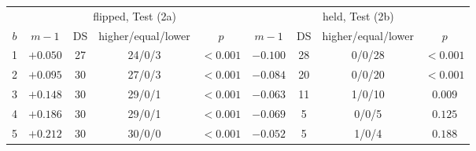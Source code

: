 \centering\footnotesize\setlength{\tabcolsep}{5pt}\begin{tabular}{@{}ccccccccc@{}}\toprule
 & \multicolumn{4}{c}{flipped, Test (2a)} & \multicolumn{4}{c}{held, Test (2b)} \\ \cmidrule(lr){2-5}\cmidrule(l){6-9}
$b$ & $m - 1$ & DS & higher/equal/lower & $p$ & $m - 1$ & DS & higher/equal/lower & $p$ \\ \midrule
1 & $+0.050$ & 27 & 24/0/3 & $<0.001$ & $-0.100$ & 28 & 0/0/28 & $<0.001$ \\
2 & $+0.095$ & 30 & 27/0/3 & $<0.001$ & $-0.084$ & 20 & 0/0/20 & $<0.001$ \\
3 & $+0.148$ & 30 & 29/0/1 & $<0.001$ & $-0.063$ & 11 & 1/0/10 & $0.009$ \\
4 & $+0.186$ & 30 & 29/0/1 & $<0.001$ & $-0.069$ & 5 & 0/0/5 & $0.125$ \\
5 & $+0.212$ & 30 & 30/0/0 & $<0.001$ & $-0.052$ & 5 & 1/0/4 & $0.188$ \\
\bottomrule\end{tabular}
